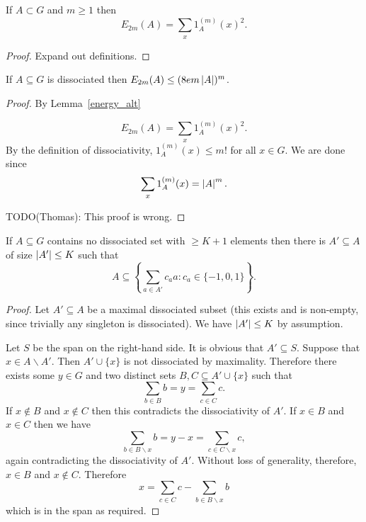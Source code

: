 \begin{lemma}
\label{energy_alt}
\leanok
If $A\subset G$ and $m\geq 1$ then
\[E_{2m}(A) = \sum_x 1_A^{(m)}(x)^2.\]
\end{lemma}

\begin{proof}
\leanok
Expand out definitions.
\end{proof}


\begin{lemma}
\label{diss_energy}
\leanok
If $A\subseteq G$ is dissociated then $E_{2m}(A) \leq (8e m \left\lvert A\right\rvert)^m$.
\end{lemma}
\begin{proof}
By Lemma~\ref{energy_alt}

\[E_{2m}(A) = \sum_x 1_A^{(m)}(x)^2.\]
By the definition of dissociativity, $1_A^{(m)}(x)\leq m!$ for all $x\in G$. We are done since
\[ \sum_x 1_A^{(m)}(x) = \left\lvert A\right\rvert^m.\]

TODO(Thomas): This proof is wrong.
\end{proof}


\begin{lemma}
\label{diss_span}
\leanok
If $A\subseteq G$ contains no dissociated set with $\geq K+1$ elements then there is $A'\subseteq A$ of size $\left\lvert A'\right\rvert\leq K$ such that
\[A\subseteq \left\{ \sum_{a\in A'}c_aa : c_a\in \{-1,0,1\} \right\}.\]
\end{lemma}

\begin{proof}
\leanok
Let $A'\subseteq A$ be a maximal dissociated subset (this exists and is non-empty, since trivially any singleton is dissociated). We have $\left\lvert A'\right\rvert\leq K$ by assumption.

Let $S$ be the span on the right-hand side. It is obvious that $A'\subseteq S$. Suppose that $x\in A\backslash A'$. Then $A'\cup\{x\}$ is not dissociated by maximality. Therefore there exists some $y\in G$ and two distinct sets $B,C\subseteq A'\cup \{x\}$ such that
\[\sum_{b\in B}b = y = \sum_{c\in C} c.\]
If $x\not\in B$ and $x\not\in C$ then this contradicts the dissociativity of $A'$. If $x\in B$ and $x\in C$ then we have
\[\sum_{b\in B\backslash x}b=y-x=\sum_{c\in C\backslash x}c,\]
again contradicting the dissociativity of $A'$. Without loss of generality, therefore, $x\in B$ and $x\not\in C$. Therefore
\[x=\sum_{c\in C}c - \sum_{b\in B\backslash x}b\]
which is in the span as required.
\end{proof}


